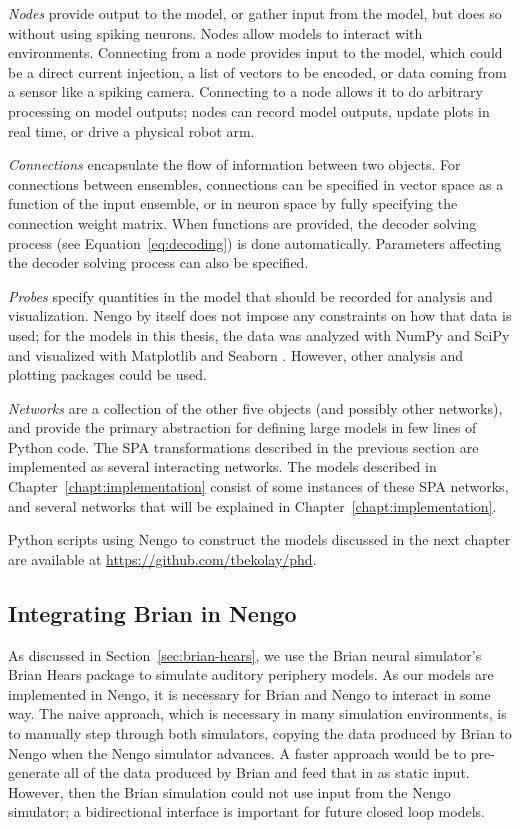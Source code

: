 \textit{Nodes} provide output
to the model, or gather input from the model,
but does so without using spiking neurons.
Nodes allow models to interact with environments.
Connecting from a node provides input
to the model, which could be
a direct current injection,
a list of vectors to be encoded,
or data coming from a sensor
like a spiking camera.
Connecting to a node allows it
to do arbitrary processing on
model outputs;
nodes can record model outputs,
update plots in real time,
or drive a physical robot arm.

\textit{Connections} encapsulate
the flow of information between two objects.
For connections between ensembles,
connections can be specified in vector space
as a function of the input ensemble,
or in neuron space
by fully specifying the connection weight matrix.
When functions are provided,
the decoder solving process
(see Equation~\eqref{eq:decoding})
is done automatically.
Parameters affecting
the decoder solving process
can also be specified.

\textit{Probes} specify quantities
in the model that should be recorded
for analysis and visualization.
Nengo by itself does not
impose any constraints on how
that data is used;
for the models in this thesis,
the data was analyzed with
NumPy \citep{vanderwalt2011}
and SciPy \citep{jones2015}
and visualized with
Matplotlib \citep{hunter2007}
and Seaborn \citep{waskom2014}.
However, other analysis and plotting packages
could be used.

\textit{Networks} are a collection of
the other five objects
(and possibly other networks),
and provide the primary abstraction
for defining large models
in few lines of Python code.
The SPA transformations
described in the previous section
are implemented as several
interacting networks.
The models described
in Chapter~\ref{chapt:implementation} consist
of some instances of
these SPA networks,
and several networks
that will be explained
in Chapter~\ref{chapt:implementation}.

Python scripts using Nengo to construct
the models discussed in the next chapter
are available at \url{https://github.com/tbekolay/phd}.

\subsection{Integrating Brian in Nengo}

As discussed in Section~\ref{sec:brian-hears},
we use the Brian neural simulator's
Brian Hears package
to simulate auditory periphery models.
As our models are implemented in Nengo,
it is necessary for Brian and Nengo
to interact in some way.
The naive approach,
which is necessary in many simulation environments,
is to manually step through both simulators,
copying the data produced by Brian
to Nengo when the Nengo simulator advances.
A faster approach would be to
pre-generate all of the data
produced by Brian
and feed that in as
static input.
However,
then the Brian simulation could not
use input from the Nengo simulator;
a bidirectional interface
is important for future closed loop models.

